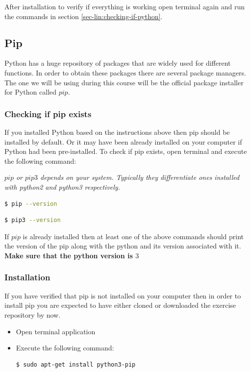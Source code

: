 \documentclass{cmc}
\begin{document}
After installation to verify if everything is working open terminal
again and run the commands in section
\ref{sec-lin:checking-if-python}.

\subsection{Pip}
\label{sec-lin:pip}

Python has a huge repository of packages that are widely used for
different functions. In order to obtain these packages there are
several package managers. The one we will be using during this course
will be the official package installer for Python called $pip$.

\subsubsection{Checking if pip exists}
\label{sec-lin:checking-if-pip}

If you installed Python based on the instructions above then pip
should be installed by default. Or it may have been already installed
on your computer if Python had been pre-installed. To check if pip
exists, open terminal and execute the following command:

\textbf{}\textit{$pip$ or $pip3$ depends on your
  system. Typically they differentiate ones installed with python2 and
  python3 respectively.}

\begin{lstlisting}[language=bash]
$ pip --version
\end{lstlisting}

\begin{lstlisting}[language=bash]
$ pip3 --version
\end{lstlisting}

If
$pip$ is already installed then at least one of the above commands
should print the version of the pip along with the python and its
version associated with it. \textbf{Make sure that the python version
  is $3$}

\subsubsection{Installation}
\label{sec-lin:installation-pip}
If you have verified that pip is not installed on your computer then
in order to install pip you are expected to have either cloned or
downloaded the exercise repository by now.
\begin{itemize}
\item Open terminal application
\item Execute the following command:
\begin{lstlisting}[language=bash]
$ sudo apt-get install python3-pip
\end{lstlisting}
\end{itemize}
\end{document}
